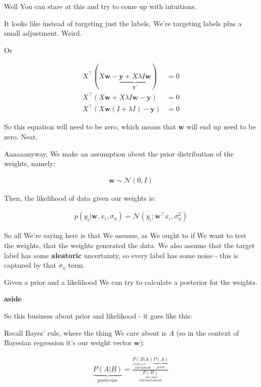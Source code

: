 \documentclass{article}
\begin{document}
		Well You can stare at this and try to come up with intuitions. 
		
		It looks like instead of targeting just the labels, We're targeting labels plus a small adjustment. Weird.
		
		Or
		
		\begin{align}
			X^\top (X\mathbf{w} -  \underbrace{\mathbf{y} + X\lambda I\mathbf{w}}_{\mathbf{y}'} ) &= 0\\
			X^\top (X\mathbf{w} + X\lambda I\mathbf{w} -  \mathbf{y}  ) &= 0\\
			X^\top (X\mathbf{w}(I + \lambda I) -  \mathbf{y}  ) &= 0
		\end{align}
		
		So this equation will need to be zero, which means that $\mathbf{w}$ will end up need to be zero. Neat.
		
		Aaaaaanyway, We make an assumption about the prior distribution of the weights, namely:
		
		\begin{align}
			\mathbf{w}\sim\mathcal{N}(0, I)
		\end{align}
		
		Then, the likelihood of data given our weights is:
		
		\begin{align}
			p(y_i|\mathbf{w}, x_i, \sigma_n) = \mathcal{N}(y_i; \mathbf{w}^\top x_i, \sigma_n^2)
		\end{align}
		
		So all We're saying here is that We assume, as We ought to if We want to test the weights, that the weights generated the data. We also assume that the target label has some \textbf{aleatoric} uncertainty, so every label has some noise - this is captured by that $\sigma_n$ term.
		
		Given a prior and a likelihood We can try to calculate a posterior for the weights.
		
		\textbf{aside}
		
		So this business about prior and likelihood - it goes like this:
		
		Recall Bayes' rule, where the thing We care about is $A$ (so in the context of Bayesian regression it's our weight vector $\mathbf{w}$):
		
		\begin{align}
			\underbrace{P(A|B)}_{posterior} = \frac{\underbrace{P(B|A)}_{likelihood}\underbrace{P(A)}_{prior}}{\underbrace{P(B)}_{normalization}}
		\end{align}
		
\end{document}
